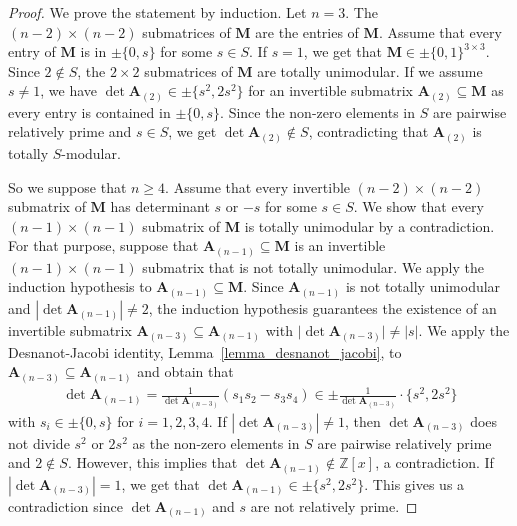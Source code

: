 \documentclass[a4paper, 11pt]{article}
\newcommand{\Z}{\mathbb{Z}}
\newcommand{\bA}{\bm{A}}
\newcommand{\bM}{\bm{M}}
\newcommand{\indet}{x}
\newcommand{\polyring}{\Z[\indet]}
\newcommand{\polyM}{\bM}
\begin{document}
	\begin{proof}
		We prove the statement by induction. Let $n=3$. The $(n-2)\times (n-2)$ submatrices of $\polyM$ are the entries of $\polyM$. Assume that every entry of $\polyM$ is in $\pm\lbrace 0, s\rbrace$ for some $s\in S$. If $s=1$, we get that $\bM\in\pm\lbrace 0,1\rbrace^{3\times 3}$. Since $2\notin S$, the $2\times 2$ submatrices of $\bM$ are totally unimodular. If we assume $s\neq 1$, we have  $\det\bA_{(2)}\in\pm\lbrace s^2, 2s^2\rbrace$ for an invertible submatrix $\bA_{(2)}\subseteq\polyM$ as every entry is contained in $\pm\lbrace 0, s\rbrace$. Since the non-zero elements in $S$ are pairwise relatively prime and $s\in S$, we get $\det\bA_{(2)}\notin S$, contradicting that $\bA_{(2)}$ is totally $S$-modular. 
		
		So we suppose that $n\geq 4$. Assume that every invertible $(n-2)\times (n-2)$ submatrix of $\polyM$ has determinant $s$ or $-s$ for some $s\in S$. We show that every $(n-1)\times (n-1)$ submatrix of $\polyM$ is totally unimodular by a contradiction. For that purpose, suppose that $\bA_{(n-1)}\subseteq\polyM$ is an invertible $(n-1)\times (n-1)$ submatrix that is not totally unimodular. We apply the induction hypothesis to $\bA_{(n-1)}\subseteq\bM$. Since $\bA_{(n-1)}$ is not totally unimodular and $\left|\det\bA_{(n-1)}\right|\neq 2$, the induction hypothesis guarantees the existence of an invertible submatrix $\bA_{(n-3)}\subseteq\bA_{(n-1)}$ with $\bigl|\det\bA_{(n-3)}\bigr|\neq  \left|s\right|$. 
		We apply the Desnanot-Jacobi identity, Lemma~\ref{lemma_desnanot_jacobi}, to $\bA_{(n-3)}\subseteq \bA_{(n-1)}$ and obtain that 
		\begin{align*}
			\det\bA_{(n-1)} = \frac{1}{\det\bA_{(n-3)}} \left( s_1s_2-s_3s_4\right)\in\pm\frac{1}{\det\bA_{(n-3)}}\cdot\lbrace s^2, 2s^2\rbrace
		\end{align*}
		with $s_i\in\pm\lbrace 0,s\rbrace$ for $i=1,2,3,4$. If $\left|\det\bA_{(n-3)}\right| \neq 1$, then $\det\bA_{(n-3)}$ does not divide $s^2$ or $2s^2$ as the non-zero elements in $S$ are pairwise relatively prime and $2\notin S$. However, this implies that $\det\bA_{(n-1)}\notin \polyring$, a contradiction. If $\left|\det\bA_{(n-3)}\right| =1$, we get that $\det\bA_{(n-1)}\in \pm\lbrace s^2,2s^2\rbrace$. This gives us a contradiction since $\det\bA_{(n-1)}$ and $s$ are not relatively prime. 
	\end{proof}
	
\end{document}
